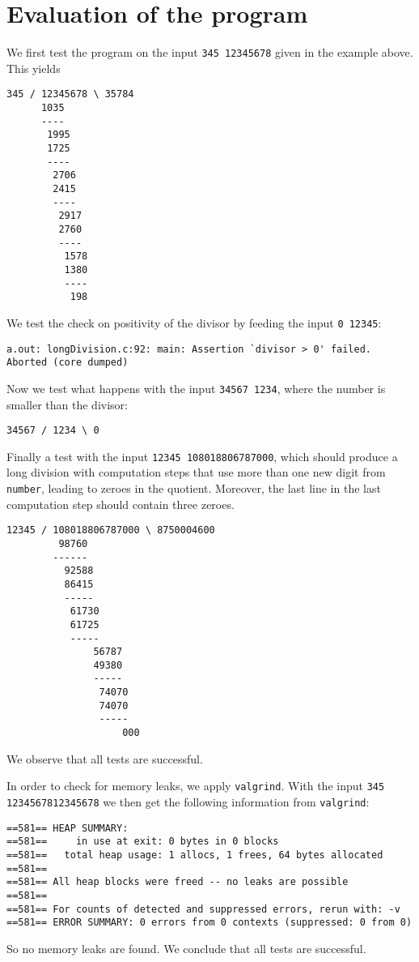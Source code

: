 \documentclass[a4paper]{article}
\begin{document}
\section{Evaluation of the program}

We first test the program on the input \verb!345 12345678! given in the example above.
This yields
\begin{verbatim}
345 / 12345678 \ 35784
      1035
      ----
       1995
       1725
       ----
        2706
        2415
        ----
         2917
         2760
         ----
          1578
          1380
          ----
           198
\end{verbatim}
We test the check on positivity of the divisor by feeding the input \verb!0 12345!:
\begin{verbatim}
a.out: longDivision.c:92: main: Assertion `divisor > 0' failed.
Aborted (core dumped)
\end{verbatim}
Now we test what happens with the input \verb!34567 1234!, where the number is smaller than the divisor:
\begin{verbatim}
34567 / 1234 \ 0
\end{verbatim}
Finally a test with the input \verb!12345 108018806787000!, which should produce a long division with computation steps that use more than one new digit from \verb!number!, leading to zeroes in the quotient.
Moreover, the last line in the last computation step should contain three zeroes.
\begin{verbatim}
12345 / 108018806787000 \ 8750004600
         98760
        ------
          92588
          86415
          -----
           61730
           61725
           -----
               56787
               49380
               -----
                74070
                74070
                -----
                    000
\end{verbatim}
We observe that all tests are successful.

In order to check for memory leaks, we apply \verb!valgrind!.
With the input \verb!345 1234567812345678! we then get the following information from \verb!valgrind!:
\begin{verbatim}
==581== HEAP SUMMARY:
==581==     in use at exit: 0 bytes in 0 blocks
==581==   total heap usage: 1 allocs, 1 frees, 64 bytes allocated
==581== 
==581== All heap blocks were freed -- no leaks are possible
==581== 
==581== For counts of detected and suppressed errors, rerun with: -v
==581== ERROR SUMMARY: 0 errors from 0 contexts (suppressed: 0 from 0)
\end{verbatim}
So no memory leaks are found.
We conclude that all tests are successful.
\end{document}
